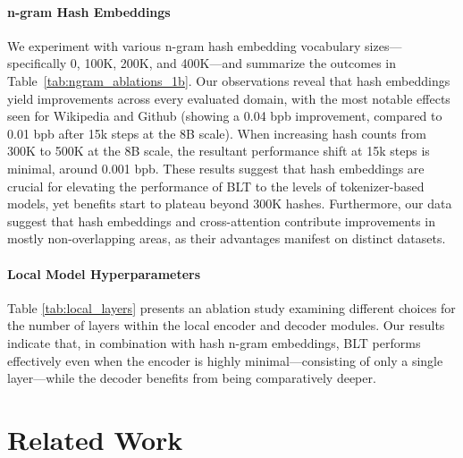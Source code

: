 \paragraph{n-gram Hash Embeddings} 

We experiment with various n-gram hash embedding vocabulary sizes—specifically 0, 100K, 200K, and 400K—and summarize the outcomes in Table~\ref{tab:ngram_ablations_1b}. Our observations reveal that hash embeddings yield improvements across every evaluated domain, with the most notable effects seen for Wikipedia and Github (showing a 0.04 bpb improvement, compared to 0.01 bpb after 15k steps at the 8B scale). When increasing hash counts from 300K to 500K at the 8B scale, the resultant performance shift at 15k steps is minimal, around 0.001 bpb. These results suggest that hash embeddings are crucial for elevating the performance of {\textsc BLT} to the levels of tokenizer-based models, yet benefits start to plateau beyond 300K hashes. Furthermore, our data suggest that hash embeddings and cross-attention contribute improvements in mostly non-overlapping areas, as their advantages manifest on distinct datasets.

\paragraph{Local Model Hyperparameters} Table \ref{tab:local_layers} presents an ablation study examining different choices for the number of layers within the local encoder and decoder modules. Our results indicate that, in combination with hash n-gram embeddings, {\textsc BLT} performs effectively even when the encoder is highly minimal—consisting of only a single layer—while the decoder benefits from being comparatively deeper.

\section{Related Work}
\label{section:related_work}

